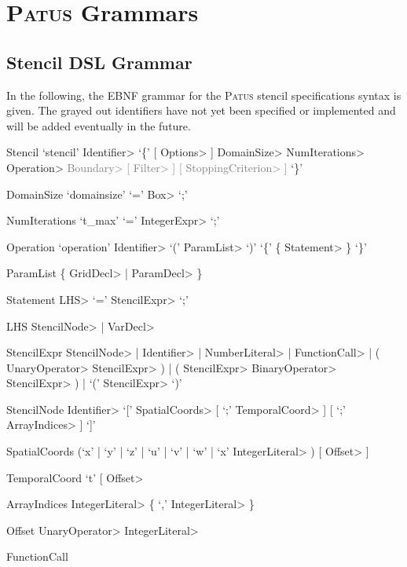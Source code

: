 \section{\textsc{Patus} Grammars}
\label{sec:appendix_grammars}

\subsection{Stencil DSL Grammar}

In the following, the EBNF grammar for the \textsc{Patus} stencil specifications syntax is given.
The grayed out identifiers have not yet been specified or implemented and will be added eventually
in the future.

\begin{EBNF}
	\item[Stencil]
		`stencil' \<Identifier> `\{' [ \<Options> ] \<DomainSize> \<NumIterations> \<Operation>
			\textcolor{gray}{\<Boundary> [ \<Filter> ] [ \<StoppingCriterion> ]} `\}'
	\item[DomainSize]
		`domainsize' `=' \<Box> `;'
	\item[NumIterations]
		`t\_max' `=' \<IntegerExpr> `;'
	\item[Operation]
    	`operation' \<Identifier> `(' \<ParamList> `)' `\{' \{ \<Statement> \} `\}'
	\item[ParamList]
		\{ \<GridDecl> | \<ParamDecl> \}
	\item[Statement]
		\<LHS> `=' \<StencilExpr> `;'
	\item[LHS]
		\<StencilNode> | \<VarDecl>
	\item[StencilExpr]
		\<StencilNode> | \<Identifier> | \<NumberLiteral> | \<FunctionCall> | ( \<UnaryOperator> \<StencilExpr> ) | ( \<StencilExpr> \<BinaryOperator> \<StencilExpr> ) | `(' \<StencilExpr> `)'
	\item[StencilNode]
		\<Identifier> `[' \<SpatialCoords> [ `;' \<TemporalCoord> ] [ `;' \<ArrayIndices> ] `]'
	\item[SpatialCoords]
		(`x' | `y' | `z' | `u' | `v' | `w' | `x' \<IntegerLiteral> ) [ \<Offset> ]
	\item[TemporalCoord]
		`t' [ \<Offset>
	\item[ArrayIndices]
		\<IntegerLiteral> \{ `,' \<IntegerLiteral> \}
	\item[Offset]
		\<UnaryOperator> \<IntegerLiteral>
	\item[FunctionCall]

\end{EBNF}

